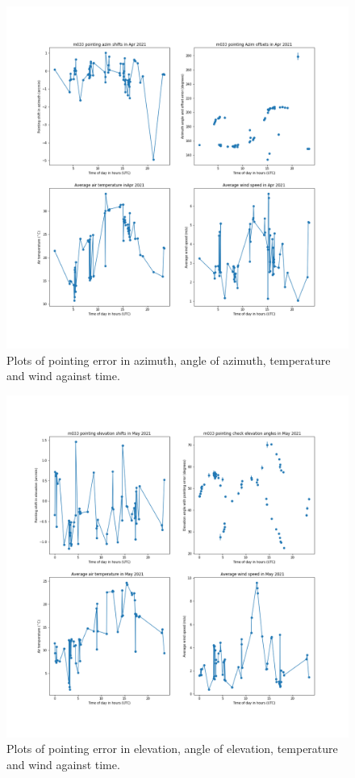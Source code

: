 \documentclass{article}
\begin{document}
\begin{figure}[H]
	\centering
	\includegraphics[scale=0.45]{m033_azim_Apr_mapped.png}
	
	\caption{Plots of pointing error in azimuth, angle of azimuth, temperature and wind against time.}
	\label{fig:m033AzimAprMapped}
\end{figure}


\begin{figure}[H]
	\centering
	\includegraphics[scale=0.45]{m033_elev_May_mapped.png}
	
	\caption{Plots of pointing error in elevation, angle of elevation, temperature and wind against time.}
	\label{fig:m033ElevMayMapped}
\end{figure}
\end{document}

